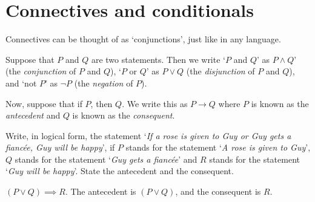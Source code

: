 \section{Connectives and conditionals}
Connectives can be thought of as `conjunctions', just like in any language.

Suppose that $P$ and $Q$ are two statements.
Then we write `$P$ and $Q$' as $P \land Q$' (the \textit{conjunction} of $P$ and $Q$), `$P$ or $Q$'
as $P \lor Q$ (the \textit{disjunction} of $P$ and $Q$), and `not $P$' as $\lnot P$ (the \textit{negation}
of $P$).

Now, suppose that if $P$, then $Q$. We write this as $P \rightarrow Q$ where
$P$ is known as the \textit{antecedent} and $Q$ is known as the \textit{consequent}.

\begin{example}
    Write, in logical form, the statement `\textit{If a rose is given to Guy or Guy gets a fianc\'{e}e, Guy will be happy}',
    if $P$ stands for the statement `\textit{A rose is given to Guy}',
    $Q$ stands for the statement `\textit{Guy gets a fianc\'{e}e}' and
    $R$ stands for the statement `\textit{Guy will be happy}'. State the antecedent and the consequent.
\end{example}
\begin{solution}
    $(P \lor Q) \implies R$. The antecedent is $(P \lor Q)$, and the
    consequent is $R$.
\end{solution}